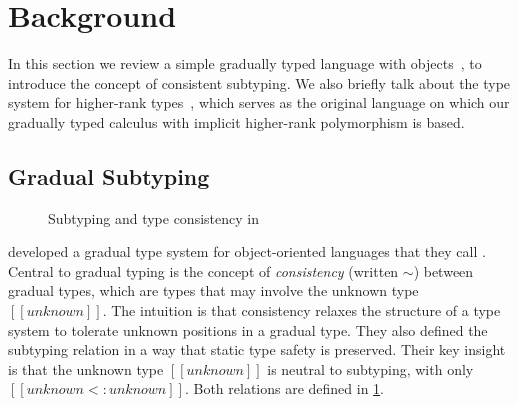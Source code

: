 \section{Background}
\label{sec:background}

In this section we review a simple gradually typed language with
objects~\citep{siek2007gradual}, to introduce the concept of consistent
subtyping. We also briefly talk about the \citeauthor{odersky1996putting} type system for
higher-rank types~\citep{odersky1996putting}, which serves as the original
language on which our gradually typed calculus with implicit 
higher-rank polymorphism is based.


\subsection{Gradual Subtyping}

\begin{figure}[t]
  \begin{small}



  \end{small}

  \caption{Subtyping and type consistency in \obb}
  \label{fig:objects}
\end{figure}

\citet{siek2007gradual} developed a gradual type system for object-oriented
languages that they call \obb. Central to gradual typing is the concept of
\emph{consistency} (written $\sim$) between gradual types, which are types
that may involve the unknown type $[[unknown]]$. The intuition is that consistency
relaxes the structure of a type system to tolerate unknown positions in a
gradual type. They also defined the subtyping relation in a way that static type
safety is preserved. Their key insight is that the unknown type $[[unknown]]$ is
neutral to subtyping, with only $[[ unknown <: unknown  ]]$. Both relations are
defined in \cref{fig:objects}.

